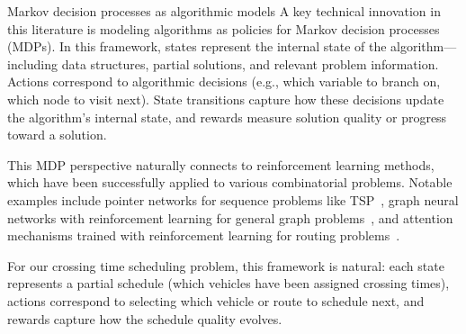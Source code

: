 \documentclass[a4paper]{report}
\theoremstyle{definition}
\theoremstyle{plain}
\begin{document}
Markov decision processes as algorithmic models A key technical innovation in
this literature is modeling algorithms as policies for Markov decision processes
(MDPs). In this framework, states represent the internal state of the
algorithm---including data structures, partial solutions, and relevant problem
information. Actions correspond to algorithmic decisions (e.g., which variable
to branch on, which node to visit next). State transitions capture how these
decisions update the algorithm's internal state, and rewards measure solution
quality or progress toward a solution.

This MDP perspective naturally connects to reinforcement learning methods, which
have been successfully applied to various combinatorial problems. Notable
examples include pointer networks for sequence problems like
TSP~\cite{vinyalsPointerNetworks2017a}, graph neural networks with reinforcement
learning for general graph
problems~\cite{daiLearningCombinatorialOptimization2018}, and attention
mechanisms trained with reinforcement learning for routing
problems~\cite{koolAttentionLearnSolve2019}.

For our crossing time scheduling problem, this framework is natural: each state
represents a partial schedule (which vehicles have been assigned crossing
times), actions correspond to selecting which vehicle or route to schedule next,
and rewards capture how the schedule quality evolves.
\end{document}
